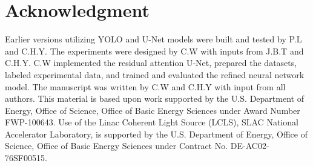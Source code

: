 \documentclass[a4paper]{article}
\begin{document}
\section*{Acknowledgment}

Earlier versions utilizing YOLO and U-Net models were built and tested by P.L and C.H.Y.  The experiments were designed by C.W with inputs from J.B.T and C.H.Y.  C.W implemented the residual attention U-Net, prepared the datasets, labeled experimental data, and trained and evaluated the refined neural network model.  The manuscript was written by C.W and C.H.Y with input from all authors.  This material is based upon work supported by the U.S.  Department of Energy, Office of Science, Office of Basic Energy Sciences under Award Number FWP-100643.  Use of the Linac Coherent Light Source (LCLS), SLAC National Accelerator Laboratory, is supported by the U.S.  Department of Energy, Office of Science, Office of Basic Energy Sciences under Contract No.  DE-AC02-76SF00515.
\end{document}
